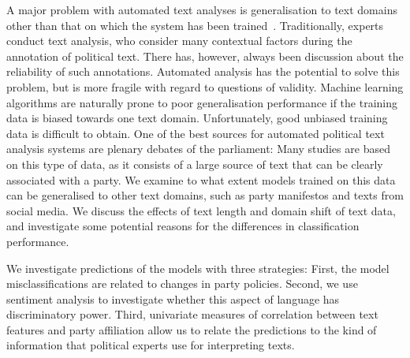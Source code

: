 \documentclass[11pt]{article}
\begin{document}
A major problem with automated text analyses is generalisation to text domains other than that on which the system has been trained~\cite{Slapin.2014}. 
Traditionally, experts conduct text analysis, who consider many contextual factors during the annotation of political text. There has, however, always been discussion about the reliability of such annotations. Automated analysis has the potential to solve this problem, but is more fragile with regard to questions of validity. 
Machine learning algorithms are naturally prone to poor generalisation performance if the training data is biased towards one text domain. Unfortunately, good unbiased training data is difficult to obtain. One of the best sources for automated political text analysis systems are plenary debates of the parliament: Many studies are based on this type of data, as it consists of a large source of text that can be clearly associated with a party. We examine to what extent models trained on this data can be generalised to other text domains, such as party manifestos and texts from social media. 
We discuss the effects of text length and domain shift of text data, and investigate some potential reasons for the differences in classification performance. 

We investigate predictions of the models with three strategies: First, the model misclassifications are related to changes in party policies. Second, we use sentiment analysis to investigate whether this aspect of language has discriminatory power. Third, univariate measures of correlation between text features and party affiliation allow us to relate the predictions to the kind of information that political experts use for interpreting texts. 
\end{document}
